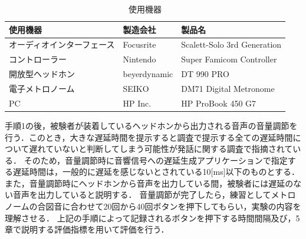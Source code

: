 \begin{table}[tbp]
  \caption{使用機器}
  \label{table:device}
  \centering
  \begin{tabular}{lll}
    \hline
    使用機器 & 製造会社 & 製品名\\
    \hline \hline
    オーディオインターフェース & Focusrite & Scalett-Solo 3rd Generation\\
    コントローラー  & Nintendo & Super Famicom Controller\\
    開放型ヘッドホン & beyerdynamic & DT 990 PRO\\
    電子メトロノーム  & SEIKO  & DM71 Digital Metronome \\
    PC  & HP Inc. & HP ProBook 450 G7 
\\
    \hline
  \end{tabular}
\end{table}

手順1の後，被験者が装着しているヘッドホンから出力される音声の音量調節を行う．このとき，大きな遅延時間を提示すると調査で提示する全ての遅延時間について遅れていないと判断してしまう可能性が発話に関する調査で指摘されている\cite{Soturonn-takahashi}．
そのため，音量調節時に音響信号への遅延生成アプリケーションで指定する遅延時間は，一般的に遅延を感じないとされている10[ms]以下のものとする．
また，音量調節時にヘッドホンから音声を出力している間，被験者には遅延のない音声を出力していると説明する．
音量調節が完了したら，練習としてメトロノームの合図音に合わせて20回から40回ボタンを押下してもらい，実験の内容を理解させる．
上記の手順によって記録されるボタンを押下する時間間隔及び，5章で説明する評価指標を用いて評価を行う．

